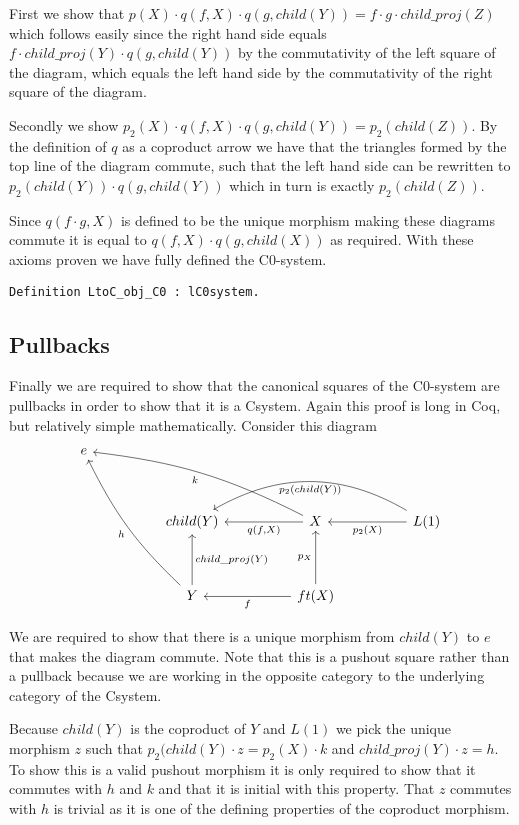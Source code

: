 First we show that $p(X)\cdot q(f, X)\cdot q(g, child(Y)) = f\cdot g\cdot
child\_proj(Z)$ which follows easily since the right hand side equals $f\cdot
child\_proj(Y)\cdot q(g, child(Y))$ by the commutativity of the left square of
the diagram, which equals the left hand side by the commutativity of the right
square of the diagram.

Secondly we show $p_2(X)\cdot q(f, X)\cdot q(g, child(Y)) = p_2 (child(Z))$.
By the definition of $q$ as a coproduct arrow we have that the triangles
formed by the top line of the diagram commute, such that the left hand side can
be rewritten to $p_2(child(Y))\cdot q(g, child(Y))$ which in turn is exactly
$p_2(child(Z))$.

Since $q(f\cdot g, X)$ is defined to be the unique morphism making these
diagrams commute it is equal to $q(f, X)\cdot q(g, child(X))$ as required. With
these axioms proven we have fully defined the C0-system.
\begin{lstlisting}
Definition LtoC_obj_C0 : lC0system.
\end{lstlisting}

\subsection{Pullbacks}
Finally we are required to show that the canonical squares of the C0-system are
pullbacks in order to show that it is a Csystem. Again this proof is long
in Coq, but relatively simple mathematically. Consider this diagram
\[
\begin{tikzcd}[sep=huge]
  e &&&\\
  &
  child(Y)&
  X
  \ar[l, "{q(f,X)}"]
  \ar[ull, bend right=10, "k"]&
  L(1)
  \ar[l, "p_2(X)"]
  \ar[ll, bend right=30, "p_2(child(Y))"]\\
  &
  Y
  \ar[uul, bend left=10, "h"]
  \ar[u, "child\_proj(Y)"']&
  ft(X)
  \ar[l, "f"]
  \ar[u, "p_X"]
\end{tikzcd}  
\]

We are required to show that there is a unique morphism from $child(Y)$ to $e$
that makes the diagram commute. Note that this is a pushout square rather than a
pullback because we are working in the opposite category to the underlying
category of the Csystem.

Because $child(Y)$ is the coproduct of $Y$ and $L(1)$ we pick the unique
morphism $z$ such that $p_2(child(Y)\cdot z = p_2(X)\cdot k$ and
$child\_proj(Y)\cdot z = h$. To show this is a valid pushout morphism it is only
required to show that it commutes with $h$ and $k$ and that it is initial with
this property. That $z$ commutes with $h$ is trivial as it is one of the
defining properties of the coproduct morphism. 

